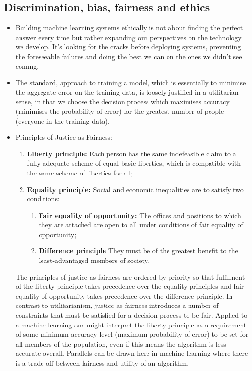 \subsection*{Discrimination, bias, fairness and ethics}

\begin{itemize}[leftmargin=*]
\item Building machine learning systems ethically is not about finding the perfect answer every time but rather expanding our perspectives on the technology we develop. It’s looking for the cracks before deploying systems, preventing the foreseeable failures and doing the best we can on the ones we didn’t see coming.
%
\item The standard, approach to training a model, which is essentially to minimise the aggregate error on the training data, is loosely justified in a utilitarian sense, in that we choose the decision process which maximises accuracy (minimises the probability of error) for the greatest number of people (everyone in the training data).
%
\item Principles of Justice as Fairness:
%
\begin{enumerate}[leftmargin=*]
\item \textbf{Liberty principle:} Each person has the same indefeasible claim to a fully adequate scheme of equal basic liberties, which is compatible with the same scheme of liberties for all;
\item \textbf{Equality principle:} Social and economic inequalities are to satisfy two conditions:
\begin{enumerate}[leftmargin=*]
\item \textbf{Fair equality of opportunity:} The offices and positions to which they are attached are open to all under conditions of fair equality of opportunity;
\item \textbf{Difference principle} They must be of the greatest benefit to the least-advantaged members of society.
\end{enumerate}
\end{enumerate}
%
The principles of justice as fairness are ordered by priority so that fulfilment of the liberty principle takes precedence over the equality principles and fair equality of opportunity takes precedence over the difference principle. In contrast to utilitarianism, justice as fairness introduces a number of constraints that must be satisfied for a decision process to be fair. Applied to a machine learning one might interpret the liberty principle as a requirement of some minimum accuracy level (maximum probability of error) to be set for all members of the population, even if this means the algorithm is less accurate overall. Parallels can be drawn here in machine learning where there is a trade-off between fairness and utility of an algorithm.

\end{itemize}
